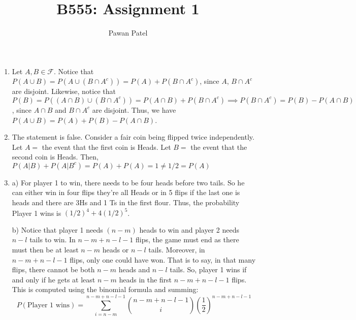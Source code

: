 \documentclass[12pt]{article}
\theoremstyle{plain}
\theoremstyle{definition}
\begin{document}
 

\title{B555: Assignment 1}
\author{Pawan Patel}
\maketitle

\begin{enumerate}

\item
Let $A, B \in \mathcal{F}$. Notice that $P(A \cup B) = P(A \cup (B \cap A^c)) = P(A) + P(B \cap A^c)$, since $A$, $B \cap A^c$ are disjoint. Likewise, notice that $P(B) = P((A \cap B) \cup (B \cap A^c)) = P(A \cap B) + P(B \cap A^c) \implies P(B \cap A^c) = P(B) - P(A \cap B)$, since $A \cap B$ and $B \cap A^c$ are disjoint. Thus, we have $P(A \cup B) = P(A) + P(B) - P(A \cap B)$.

\vspace{1pc}


\item
The statement is false. Consider a fair coin being flipped twice independently. Let $A=$ the event that the first coin is Heads. Let $B=$ the event that the second coin is Heads. Then, $P(A|B) + P(A|B^c) = P(A) + P(A) = 1 \neq 1/2 = P(A) $

\vspace{1pc}


\item

a) For player 1 to win, there needs to be four heads before two tails. So he can either win in four flips they're all Heads or in 5 flips if the last one is heads and there are 3Hs and 1 Ts in the first flour. Thus, the probability Player 1 wins is $(1/2)^4 + 4(1/2)^5$.

\vspace{1pc}

b) Notice that player 1 needs $(n-m)$ heads to win and player 2 needs $n-l$ tails to win. In $n-m + n-l -1$ flips, the game must end as there must then be at least $n-m$ heads or $n-l$ tails. Moreover, in $n-m + n-l -1$ flips, only one could have won. That is to say, in that many flips, there cannot be both $n-m$ heads and $n-l$ tails. So, player 1 wins if and only if he gets at least $n-m$ heads in the first $n-m + n-l -1$ flips. This is computed using the binomial formula and summing:
$$ P(\text{Player 1 wins}) = \sum_{i=n-m}^{n-m+n-l-1} \binom{n-m+n-l-1}{i} (\frac{1}{2})^{n-m+n-l-1}$$




\vspace{1pc}



\end{enumerate}
\end{document}
